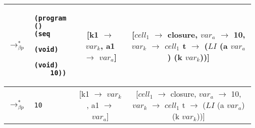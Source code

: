 \begin{table}[!htbp]
\begin{tabular}{l >{\centering\arraybackslash}m{} >{\scriptsize}c >{\scriptsize}c}
	$\longrightarrow_{\beta p}^*$&\begin{lstlisting}[style=numberless]
(program ()
(seq
	(void)
	(void)
	10))\end{lstlisting} & \thead{[k1 $\rightarrow$ $var_k$, \\a1 $\rightarrow$ $var_a$]} & \thead{[$cell_1$ $\rightarrow$ closure,\\$var_a$ $\rightarrow$ 10,\\$var_k$ $\rightarrow$ $cell_1$\\t $\rightarrow$ ($LI$\\(a $var_a$) (k $var_k$))]} \\ \hline
	$\longrightarrow_{\beta p}^*$&\begin{lstlisting}[style=numberless]
10\end{lstlisting} & \thead{[k1 $\rightarrow$ $var_k$, \\a1 $\rightarrow$ $var_a$]} & \thead{[$cell_1$ $\rightarrow$ closure,\\$var_a$ $\rightarrow$ 10,\\$var_k$ $\rightarrow$ $cell_1$\\t $\rightarrow$ ($LI$\\(a $var_a$) (k $var_k$))]} \\ \hline
  \end{tabular}
\end{table}